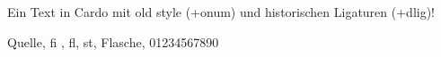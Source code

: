 \documentclass{article}
\begin{document}
\huge

Ein Text in Cardo mit old style (+onum) und historischen Ligaturen (+dlig)!

Quelle, fi , fl, st, Flasche,   01234567890
\end{document}
